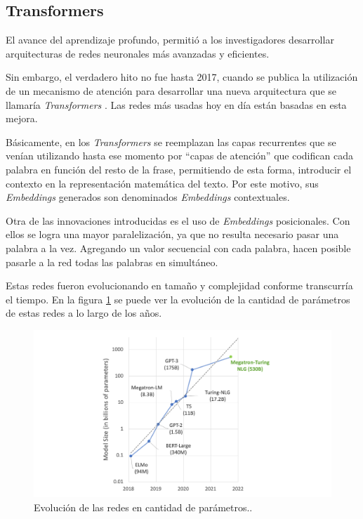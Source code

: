 \subsection{Transformers}

El avance del aprendizaje profundo, permitió a los investigadores desarrollar arquitecturas de redes neuronales más avanzadas y eficientes. 

Sin embargo, el verdadero hito no fue hasta 2017, cuando se publica la utilización de un mecanismo de atención para desarrollar una nueva arquitectura que se llamaría \textit{Transformers} \citep{ARTICLE:5}. Las redes más usadas hoy en día están basadas en esta mejora.

Básicamente, en los \textit{Transformers} se reemplazan las capas recurrentes que se venían utilizando hasta ese momento por ``capas de atención'' que codifican cada palabra en función del resto de la frase, permitiendo de esta forma, introducir el contexto en la representación matemática del texto. Por este motivo, sus \textit{Embeddings} generados son denominados \textit{Embeddings} contextuales.

Otra de las innovaciones introducidas es el uso de \textit{Embeddings} posicionales. Con ellos se logra una mayor paralelización, ya que no resulta necesario pasar una palabra a la vez. Agregando un valor secuencial con cada palabra, hacen posible pasarle a la red todas las palabras en simultáneo.

Estas redes fueron evolucionando en tamaño y complejidad conforme transcurría el tiempo. En la figura \ref{fig:transformers} se puede ver la evolución de la cantidad de parámetros de estas redes a lo largo de los años.

\begin{figure}[htbp]
	\centering
	\includegraphics[width=1\textwidth]{./Figures/transformers.png}
	\caption{Evolución de las redes en cantidad de parámetros.\protect\footnotemark.}
	\label{fig:transformers}
\end{figure}

